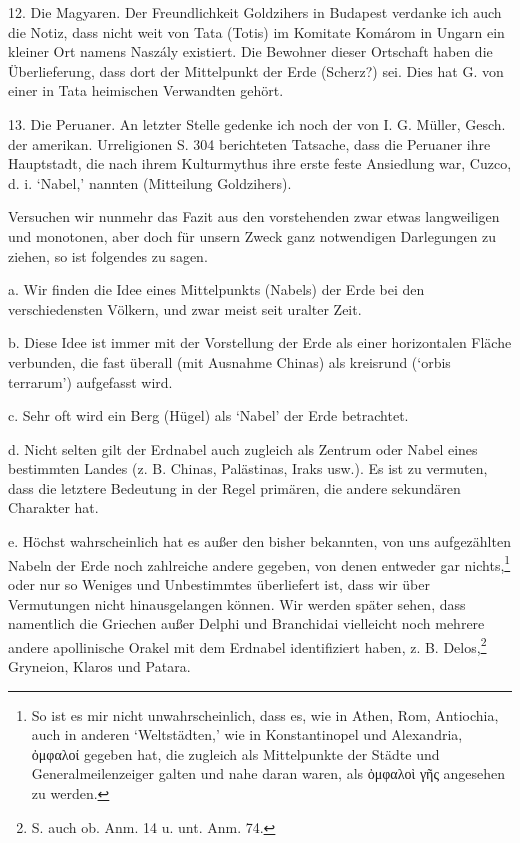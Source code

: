 \documentclass[a4paper, 11pt, oneside]{article}
\begin{document}
12. Die Magyaren. Der Freundlichkeit Goldzihers in Budapest verdanke ich auch die Notiz, dass nicht weit von Tata (Totis) im Komitate Komárom in Ungarn ein kleiner Ort namens Naszály existiert. Die Bewohner dieser Ortschaft haben die Überlieferung, dass dort der Mittelpunkt der Erde (Scherz?) sei. Dies hat G. von einer in Tata heimischen Verwandten gehört.

13. Die Peruaner. An letzter Stelle gedenke ich noch der von I. G. Müller, Gesch. der amerikan. Urreligionen S. 304 berichteten Tatsache, dass die Peruaner ihre Hauptstadt, die nach ihrem Kulturmythus ihre erste feste Ansiedlung war, Cuzco, d. i. `Nabel,' nannten (Mitteilung Goldzihers).

Versuchen wir nunmehr das Fazit aus den vorstehenden zwar etwas langweiligen und monotonen, aber doch für unsern Zweck ganz notwendigen Darlegungen zu ziehen, so ist folgendes zu sagen.

a. Wir finden die Idee eines Mittelpunkts (Nabels) der Erde bei den verschiedensten Völkern, und zwar meist seit uralter Zeit.

b. Diese Idee ist immer mit der Vorstellung der Erde als einer horizontalen Fläche verbunden, die fast überall (mit Ausnahme Chinas) als kreisrund (`orbis terrarum') aufgefasst wird.

c. Sehr oft wird ein Berg (Hügel) als `Nabel' der Erde betrachtet.

d. Nicht selten gilt der Erdnabel auch zugleich als Zentrum oder Nabel eines bestimmten Landes (z. B. Chinas, Palästinas, Iraks usw.). Es ist zu vermuten, dass die letztere Bedeutung in der Regel primären, die andere sekundären Charakter hat.

e. Höchst wahrscheinlich hat es außer den bisher bekannten, von uns aufgezählten Nabeln der Erde noch zahlreiche andere gegeben, von denen entweder gar nichts,\footnote{So ist es mir nicht unwahrscheinlich, dass es, wie in Athen, Rom, Antiochia, auch in anderen `Weltstädten,' wie in Konstantinopel und Alexandria, ὀμφαλοί gegeben hat, die zugleich als Mittelpunkte der Städte und Generalmeilenzeiger galten und nahe daran waren, als ὀμφαλοὶ γῆς angesehen zu werden.} oder nur so Weniges und Unbestimmtes überliefert ist, dass wir über Vermutungen nicht hinausgelangen können. Wir werden später sehen, dass namentlich die Griechen außer Delphi und Branchidai vielleicht noch mehrere andere apollinische Orakel mit dem Erdnabel identifiziert haben, z. B. Delos,\footnote{S. auch ob. Anm. 14 u. unt. Anm. 74.} Gryneion, Klaros und Patara.
\end{document}
